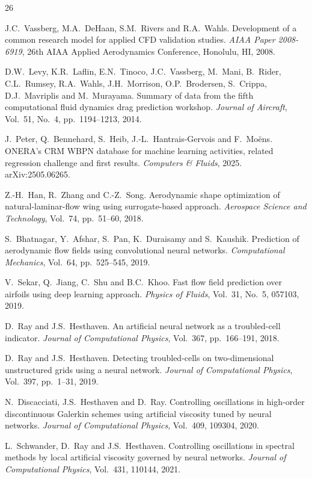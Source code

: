 \documentclass{WCCM-ECCOMAS_2026_Full_Paper}
\begin{document}
\begin{thebibliography}{26}

J.C.~Vassberg, M.A.~DeHaan, S.M.~Rivers and R.A.~Wahls.
Development of a common research model for applied CFD validation
studies.
\textit{AIAA Paper 2008-6919}, 26th AIAA Applied Aerodynamics
Conference, Honolulu, HI, 2008.

D.W.~Levy, K.R.~Laflin, E.N.~Tinoco, J.C.~Vassberg, M.~Mani,
B.~Rider, C.L.~Rumsey, R.A.~Wahls, J.H.~Morrison, O.P.~Brodersen,
S.~Crippa, D.J.~Mavriplis and M.~Murayama.
Summary of data from the fifth computational fluid dynamics drag
prediction workshop.
\textit{Journal of Aircraft}, Vol.~51, No.~4, pp.~1194--1213, 2014.

J.~Peter, Q.~Bennehard, S.~Heib, J.-L.~Hantrais-Gervois and
F.~Mo\"ens.
ONERA's CRM WBPN database for machine learning activities, related
regression challenge and first results.
\textit{Computers \& Fluids}, 2025.  arXiv:2505.06265.

Z.-H.~Han, R.~Zhang and C.-Z.~Song.
Aerodynamic shape optimization of natural-laminar-flow wing using
surrogate-based approach.
\textit{Aerospace Science and Technology}, Vol.~74, pp.~51--60, 2018.

S.~Bhatnagar, Y.~Afshar, S.~Pan, K.~Duraisamy and S.~Kaushik.
Prediction of aerodynamic flow fields using convolutional neural
networks.
\textit{Computational Mechanics}, Vol.~64, pp.~525--545, 2019.

V.~Sekar, Q.~Jiang, C.~Shu and B.C.~Khoo.
Fast flow field prediction over airfoils using deep learning approach.
\textit{Physics of Fluids}, Vol.~31, No.~5, 057103, 2019.

D.~Ray and J.S.~Hesthaven.
An artificial neural network as a troubled-cell indicator.
\textit{Journal of Computational Physics}, Vol.~367, pp.~166--191, 2018.

D.~Ray and J.S.~Hesthaven.
Detecting troubled-cells on two-dimensional unstructured grids using
a neural network.
\textit{Journal of Computational Physics}, Vol.~397, pp.~1--31, 2019.

N.~Discacciati, J.S.~Hesthaven and D.~Ray.
Controlling oscillations in high-order discontinuous Galerkin schemes
using artificial viscosity tuned by neural networks.
\textit{Journal of Computational Physics}, Vol.~409, 109304, 2020.

L.~Schwander, D.~Ray and J.S.~Hesthaven.
Controlling oscillations in spectral methods by local artificial
viscosity governed by neural networks.
\textit{Journal of Computational Physics}, Vol.~431, 110144, 2021.


\end{thebibliography}
\end{document}
